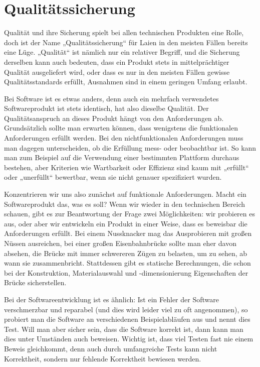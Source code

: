 \cleardoublepage
\chapter{Qualitätssicherung}
\label{sec:Kap-11}

Qualität und ihre Sicherung spielt bei allen technischen Produkten eine Rolle, doch ist der Name „Qualitäts\-sicherung“ für Laien in den meisten Fällen bereits eine Lüge. „Qualität“ ist nämlich nur ein relativer Begriff, und die Sicherung derselben kann auch bedeuten, dass ein Produkt stets in mittelprächtiger Qualität ausgeliefert wird, oder dass es nur in den meisten Fällen gewisse Qualitätsstandards erfüllt, Ausnahmen sind in einem geringen Umfang erlaubt.

\vspace{2mm} %

Bei Software ist es etwas anders, denn auch ein mehrfach verwendetes Softwareprodukt ist stets identisch, hat also dieselbe Qualität. Der Qualitätsanspruch an dieses Produkt hängt von den Anforderungen ab. Grundsätzlich sollte man erwarten können, dass wenigstens die funktionalen Anforderungen erfüllt werden. Bei den nichtfunktionalen Anforderungen muss man dagegen unterscheiden, ob die Erfüllung mess- oder beobachtbar ist. So kann man zum Beispiel auf die Verwendung einer bestimmten Plattform durchaus bestehen, aber Kriterien wie Wartbarkeit oder \mbox{Effizienz} sind kaum mit „erfüllt“ oder „unerfüllt“ bewertbar, wenn sie nicht genauer spezifiziert wurden.

\vspace{2mm} %

Konzentrieren wir uns also zunächst auf funktionale Anforderungen. Macht ein Software\-produkt das, was es soll? Wenn wir wieder in den technischen Bereich schauen, gibt es zur Beantwortung der Frage zwei Möglichkeiten: wir probieren es aus, oder aber wir entwickeln ein Produkt in einer Weise, dass es beweisbar die Anforderungen erfüllt. Bei einem Nussknacker mag das Ausprobieren mit großen Nüssen ausreichen, bei einer großen Eisenbahnbrücke sollte man eher davon absehen, die Brücke mit immer schwereren Zügen zu belasten, um zu sehen, ab wann sie zusammen\-bricht. Stattdessen gibt es statische Berechnungen, die schon bei der Konstruktion, Materialauswahl und -dimensionierung Eigenschaften der Brücke sicher\-stellen. 

\vspace{2mm} %

Bei der Softwareentwicklung ist es ähnlich: Ist ein Fehler der Software verschmerzbar und reparabel (und dies wird leider viel zu oft angenommen), so probiert man die Software an verschiedenen Beispielabläufen aus und nennt dies Test. Will man aber sicher sein, dass die Software korrekt ist, dann kann man dies unter Umständen auch beweisen. Wichtig ist, dass viel Testen fast nie einem Beweis gleichkommt, denn auch durch umfangreiche Tests kann nicht Korrektheit, sondern nur fehlende Korrektheit bewiesen werden. 

